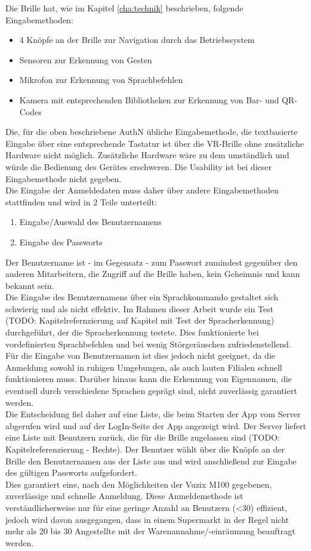 Die Brille hat, wie im Kapitel \ref{cha:technik} beschrieben, folgende Eingabemethoden:
\begin{itemize}
	\item 4 Knöpfe an der Brille zur Navigation durch das Betriebssystem
	\item Sensoren zur Erkennung von Gesten
	\item Mikrofon zur Erkennung von Sprachbefehlen
	\item Kamera mit entsprechenden Bibliotheken zur Erkennung von Bar- und QR-Codes
\end{itemize}
Die, für die oben beschriebene \acf{AuthN} übliche Eingabemethode, die textbasierte Eingabe über eine entsprechende Tastatur ist über die \ac{VR}-Brille ohne zusätzliche Hardware nicht möglich. Zusätzliche Hardware wäre zu dem umständlich und würde die Bedienung des Gerätes erschweren. Die Usability ist bei dieser Eingabemethode nicht gegeben.\\

Die Eingabe der Anmeldedaten muss daher über andere Eingabemethoden stattfinden und wird in 2 Teile unterteilt:
\begin{enumerate}
	\item Eingabe/Auswahl des Benutzernamens
	\item Eingabe des Passworts
\end{enumerate}

Der Benutzername ist - im Gegensatz - zum Passwort zumindest gegenüber den anderen Mitarbeitern, die Zugriff auf die Brille haben, kein Geheimnis und kann bekannt sein.\\
Die Eingabe des Benutzernamens über ein Sprachkommando gestaltet sich schwierig und als nicht effektiv. Im Rahmen dieser Arbeit wurde ein Test (TODO: Kapitelrefernzierung auf Kapitel mit Test der Spracherkennung) durchgeführt, der die Spracherkennung testete. Dies funktionierte bei vordefinierten Sprachbefehlen und bei wenig Störgeräuschen zufriedenstellend. Für die Eingabe von Benutzernamen ist dies jedoch nicht geeignet, da die Anmeldung sowohl in ruhigen Umgebungen, als auch lauten Filialen schnell funktionieren muss. Darüber hinaus kann die Erkennung von Eigennamen, die eventuell durch verschiedene Sprachen geprägt sind, nicht zuverlässig garantiert werden.\\
Die Entscheidung fiel daher auf eine Liste, die beim Starten der App vom Server abgerufen wird und auf der LogIn-Seite der App angezeigt wird. Der Server liefert eine Liste mit Benutzern zurück, die für die Brille zugelassen sind (TODO: Kapitelreferenzierung - Rechte). Der Benutzer wählt über die Knöpfe an der Brille den Benutzernamen aus der Liste aus und wird anschließend zur Eingabe des gültigen Passworts aufgefordert.\\
Dies garantiert eine, nach den Möglichkeiten der Vuzix M100 gegebenen, zuverlässige und schnelle Anmeldung. Diese Anmeldemethode ist verständlicherweise nur für eine geringe Anzahl an Benutzern (<30) effizient, jedoch wird davon ausgegangen, dass in einem Supermarkt in der Regel nicht mehr als 20 bis 30 Angestellte mit der Warenannahme/-einräumung beauftragt werden.\\

